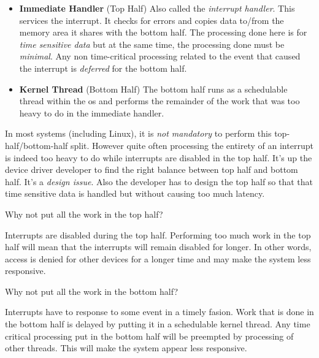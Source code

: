 \begin{itemize}   
\renewcommand{\labelitemi}{$\Box$}
\item \textbf{Immediate Handler} (Top Half)
Also called the \textit{interrupt handler}. 
This services the interrupt. It checks for errors and copies data to/from 
the memory area it shares with the bottom half.
The processing done here is for \textit{time sensitive data} but at the same time, 
the processing done must be \textit{minimal}. Any non time-critical processing related
to the event that caused the interrupt is \textit{deferred} for the bottom half.
\item \textbf{Kernel Thread} (Bottom Half)
The bottom half runs as a schedulable thread within the os and performs
the remainder of the work that was too heavy to do in the immediate handler. 
\end{itemize}

In most systems (including Linux), it is \textit{not mandatory} to perform this top-half/bottom-half 
split. However quite often processing the entirety of an interrupt is indeed 
too heavy to do while interrupts are disabled in the top half. 
It's up the device driver developer to find the right balance between 
top half and bottom half. It's a \textit{design issue}. Also the developer has to design the top half 
so that that time sensitive data is handled but without causing too much latency. 

\frmrule

\begin{example}
Why not put all the work in the top half?

Interrupts are disabled during the top half. Performing too much work in the top half 
will mean that the interrupts will remain disabled for longer. In other words, 
access is denied for other devices 
for a longer time and may make the system less responsive.
\end{example}

\frmrule

\begin{example}
Why not put all the work in the bottom half?

Interrupts have to response to some event in a timely fasion. Work that is done in the bottom 
half is delayed by putting it in a schedulable kernel thread. Any time critical processing put 
in the bottom half will be preempted by processing of other threads. 
This will make the system appear less responsive.
\end{example}

